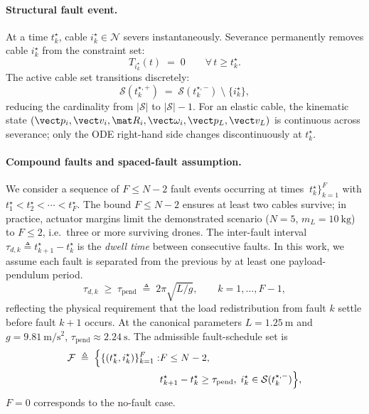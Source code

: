 \paragraph{Structural fault event.} At a time $t_k^\star$, cable $i_k^\star \in \mathcal{N}$ severs instantaneously. Severance permanently removes cable $i_k^\star$ from the constraint set:
\begin{equation}
 T_{i_k^\star}(t) \;=\; 0
  \qquad \forall\, t \ge t_k^\star.
  \label{eq:fault-tension-zero}
\end{equation}
The active cable set transitions discretely:
\begin{equation}
  \mathcal{S}(t_k^{\star,+}) \;=\; \mathcal{S}(t_k^{\star,-})
    \;\setminus\; \{i_k^\star\},
  \label{eq:S-transition}
\end{equation}
reducing the cardinality from $|\mathcal{S}|$ to $|\mathcal{S}| - 1$. For an elastic cable, the kinematic state $(\vect p_i, \vect v_i, \mat R_i, \vect\omega_i, \vect p_L, \vect v_L)$ is continuous across severance; only the ODE right-hand side changes discontinuously at $t_k^\star$.

\paragraph{Compound faults and spaced-fault assumption.} We consider a sequence of $F \le N-2$ fault events occurring at times $\ t_k^\star\}_{k=1}^F$ with $t_1^\star < t_2^\star < \cdots < t_F^\star$. The bound $F \le N-2$ ensures at least two cables survive; in practice, actuator margins limit the demonstrated scenario ($N = 5$, $m_L = \SI{10}{\kilo\gram}$) to $F \le 2$, i.e.\ three or more surviving drones. The inter-fault interval $\tau_{d,k} \triangleq t_{k+1}^\star - t_k^\star$ is the
\emph{dwell time} between consecutive faults. In this work, we assume each fault is separated from the previous by at least one payload-pendulum period.
\begin{equation}
  \tau_{d,k} \;\ge\; \tau_{\mathrm{pend}} \;\triangleq\;
    2\pi\sqrt{L/g}, \qquad k = 1, \dots, F-1,
  \label{eq:dwell-assumption}
\end{equation}
reflecting the physical requirement that the load redistribution from fault $k$ settle before fault $k+1$ occurs. At the canonical parameters $L = \SI{1.25}{\metre}$ and $g = \SI{9.81}{\metre\per\second\squared}$, $\tau_{\mathrm{pend}} \approx \SI{2.24}{\second}$. The admissible fault-schedule set is
\begin{align}
\label{eq:fault-schedule-set}
  \mathcal{F} \;\triangleq\;
    \Bigl\{
      \{(t_k^\star, i_k^\star)\}_{k=1}^F :
 &F \le N-2,\;\\
 &t_{k+1}^\star - t_k^\star \ge \tau_{\mathrm{pend}},\;
 i_k^\star \in \mathcal{S}(t_k^{\star,-})
    \Bigr\},\nonumber
\end{align}
$F = 0$ corresponds to the no-fault case.

